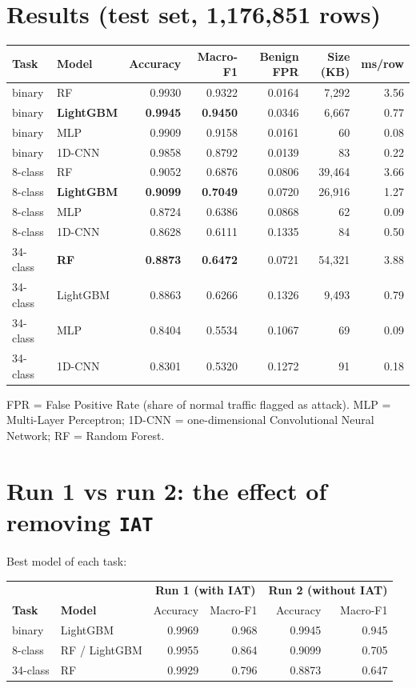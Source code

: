 \documentclass[11pt]{article}
\begin{document}
\section{Results (test set, 1,176,851 rows)}
\begin{longtable}{@{}l l r r r r r@{}}
\toprule
\textbf{Task} & \textbf{Model} & \textbf{Accuracy} & \textbf{Macro-F1} & \textbf{Benign FPR} & \textbf{Size (KB)} & \textbf{ms/row} \\
\midrule
\endhead
binary & RF & 0.9930 & 0.9322 & 0.0164 & 7,292 & 3.56 \\
binary & \textbf{LightGBM} & \textbf{0.9945} & \textbf{0.9450} & 0.0346 & 6,667 & 0.77 \\
binary & MLP & 0.9909 & 0.9158 & 0.0161 & 60 & 0.08 \\
binary & 1D-CNN & 0.9858 & 0.8792 & 0.0139 & 83 & 0.22 \\
\midrule
8-class & RF & 0.9052 & 0.6876 & 0.0806 & 39,464 & 3.66 \\
8-class & \textbf{LightGBM} & \textbf{0.9099} & \textbf{0.7049} & 0.0720 & 26,916 & 1.27 \\
8-class & MLP & 0.8724 & 0.6386 & 0.0868 & 62 & 0.09 \\
8-class & 1D-CNN & 0.8628 & 0.6111 & 0.1335 & 84 & 0.50 \\
\midrule
34-class & \textbf{RF} & \textbf{0.8873} & \textbf{0.6472} & 0.0721 & 54,321 & 3.88 \\
34-class & LightGBM & 0.8863 & 0.6266 & 0.1326 & 9,493 & 0.79 \\
34-class & MLP & 0.8404 & 0.5534 & 0.1067 & 69 & 0.09 \\
34-class & 1D-CNN & 0.8301 & 0.5320 & 0.1272 & 91 & 0.18 \\
\bottomrule
\end{longtable}
FPR = False Positive Rate (share of normal traffic flagged as attack). MLP = Multi-Layer Perceptron; 1D-CNN = one-dimensional Convolutional Neural Network; RF = Random Forest.

\section{Run 1 vs run 2: the effect of removing \texttt{IAT}}
Best model of each task:

\begin{center}
\begin{tabular}{@{}l l r r r r@{}}
\toprule
& & \multicolumn{2}{c}{\textbf{Run 1 (with IAT)}} & \multicolumn{2}{c}{\textbf{Run 2 (without IAT)}} \\
\textbf{Task} & \textbf{Model} & Accuracy & Macro-F1 & Accuracy & Macro-F1 \\
\midrule
binary & LightGBM & 0.9969 & 0.968 & 0.9945 & 0.945 \\
8-class & RF / LightGBM & 0.9955 & 0.864 & 0.9099 & 0.705 \\
34-class & RF & 0.9929 & 0.796 & 0.8873 & 0.647 \\
\bottomrule
\end{tabular}
\end{center}
\end{document}
